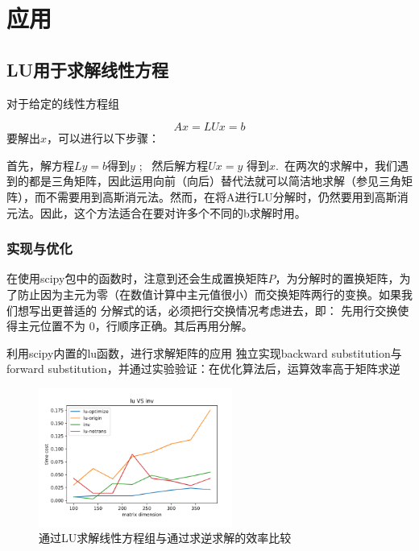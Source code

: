 \documentclass{ctexrep}
\begin{document}
\chapter{应用}
\label{chap:application}
\section{LU用于求解线性方程}

对于给定的线性方程组

$$ Ax=LUx=b$$
要解出$x$，可以进行以下步骤：

首先，解方程$ Ly=b$得到$y$ ; \
然后解方程$ Ux=y$ 得到$x$.\
在两次的求解中，我们遇到的都是三角矩阵，因此运用向前（向后）替代法就可以简洁地求解（参见三角矩阵），而不需要用到高斯消元法。然而，在将A进行LU分解时，仍然要用到高斯消元法。因此，这个方法适合在要对许多个不同的b求解时用。

\subsection{实现与优化}
在使用scipy包中的函数时，注意到还会生成置换矩阵$P$，为分解时的置换矩阵，为了防止因为主元为零（在数值计算中主元值很小）而交换矩阵两行的变换。如果我们想写出更普适的 分解式的话，必须把行交换情况考虑进去，即： 先用行交换使得主元位置不为 0，行顺序正确。其后再用分解。

利用scipy内置的lu函数，进行求解矩阵的应用
独立实现backward substitution与forward substitution，并通过实验验证：在优化算法后，运算效率高于矩阵求逆

\begin{figure}[ht]
    \centering
	\includegraphics[width=180pt]{figures/comparison.png}
	\caption{通过LU求解线性方程组与通过求逆求解的效率比较}
	\label{fig:LU}
\end{figure}
\end{document}
